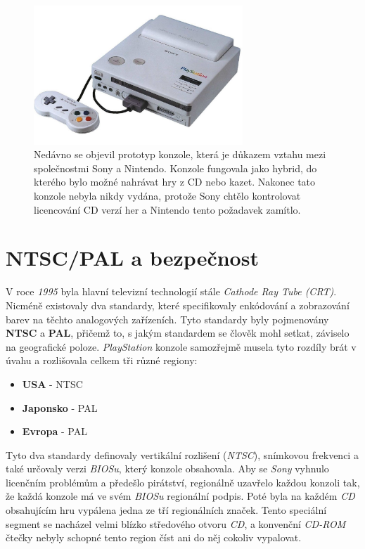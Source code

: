 \begin{figure}[hbt]
\centering
\includegraphics[width=0.7\textwidth]{obrazky-figures/sony-and-nintendo-console.jpg}
\caption{Nedávno se objevil prototyp konzole, která je důkazem vztahu mezi společnostmi Sony a Nintendo. Konzole fungovala jako hybrid, do kterého bylo možné nahrávat hry z CD nebo kazet. Nakonec tato konzole nebyla nikdy vydána, protože Sony chtělo kontrolovat licencování CD verzí her a Nintendo tento požadavek zamítlo.}
\label{sony-and-nintendo-console}
\end{figure}

\section{NTSC/PAL a bezpečnost}

V roce \textit{1995} byla hlavní televizní technologií stále \textit{Cathode Ray Tube (CRT)}. 
Nicméně existovaly dva standardy, které specifikovaly enkódování a zobrazování barev na těchto analogových zařízeních. 
Tyto standardy byly pojmenovány \textbf{NTSC} a \textbf{PAL}, přičemž to, s jakým standardem se člověk mohl setkat, 
záviselo na geografické poloze. \textit{PlayStation} konzole samozřejmě musela tyto rozdíly brát v úvahu a rozlišovala celkem tři různé regiony:

\begin{itemize}
\item{\textbf{USA} - NTSC}
\item{\textbf{Japonsko} - PAL}
\item{\textbf{Evropa} - PAL}
\end{itemize}

Tyto dva standardy definovaly vertikální rozlišení (\textit{NTSC}), snímkovou frekvenci a také určovaly verzi \textit{BIOSu}, 
který konzole obsahovala. Aby se \textit{Sony} vyhnulo licenčním problémům a předešlo pirátství, 
regionálně uzavřelo každou konzoli tak, že každá konzole má ve svém \textit{BIOSu} regionální podpis. 
Poté byla na každém \textit{CD} obsahujícím hru vypálena jedna ze tří regionálních značek. 
Tento speciální segment se nacházel velmi blízko středového otvoru \textit{CD}, a konvenční \textit{CD-ROM} čtečky 
nebyly schopné tento region číst ani do něj cokoliv vypalovat.


